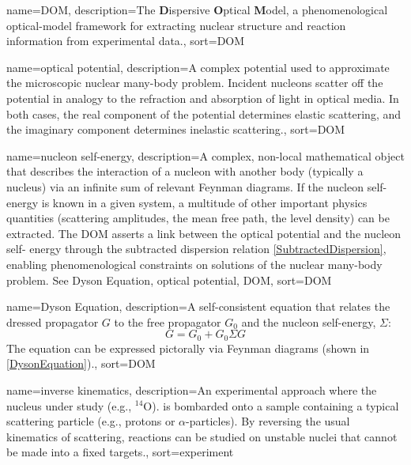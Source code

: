 \makeglossaries

{
    name={DOM},
    description={The \textbf{D}ispersive \textbf{O}ptical \textbf{M}odel, a phenomenological optical-model framework for extracting nuclear structure and reaction information from experimental data.},
    sort={DOM}
}

{
    name={optical potential},
    description={A complex potential used to approximate the microscopic nuclear many-body problem. Incident nucleons scatter off the potential in analogy to the refraction and absorption of light in optical media.  In both cases, the real component of the potential determines elastic scattering, and the imaginary component determines inelastic scattering.},
    sort={DOM}
}

{
    name={nucleon self-energy},
    description={A complex, non-local mathematical object that describes the interaction of a
        nucleon with another body (typically a nucleus) via an infinite sum of relevant Feynman 
        diagrams. If the nucleon self-energy is known in a given system, a multitude of other 
        important physics quantities (scattering amplitudes, the mean free path, the level density) 
        can be extracted. The DOM asserts a link between the optical potential and the nucleon self-
        energy through the subtracted dispersion relation \ref{SubtractedDispersion}, enabling 
        phenomenological constraints on solutions of the nuclear many-body 
        problem. See \Gls{Dyson Equation}, \Gls{optical potential}, \Gls{DOM}},
    sort={DOM}
}

{
    name={Dyson Equation},
    description={A self-consistent equation that relates the dressed propagator $G$ to the free
        propagator $G_{0}$ and the \Gls{nucleon self-energy}, $\Sigma$:
        \begin{equation}
            G = G_{0} + G_{0} \Sigma G
        \end{equation}
        The equation can be expressed pictorally via Feynman diagrams (shown in
        \ref{DysonEquation}).},
    sort={DOM}
}

{
    name={inverse kinematics},
    description={An experimental approach where the nucleus under study
        (e.g., $^{14}$O). is bombarded onto a sample containing a typical
        scattering particle (e.g., protons or $\alpha$-particles).
        By reversing the usual kinematics of scattering,
        reactions can be studied on unstable nuclei that
    cannot be made into a fixed targets.},
    sort={experiment}
}
